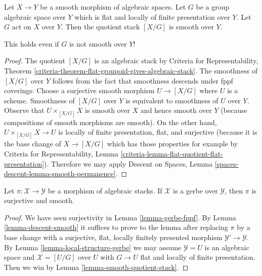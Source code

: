 \begin{lemma}
\label{lemma-smooth-quotient-stack}
Let $X \to Y$ be a smooth morphism of algebraic spaces.
Let $G$ be a group algebraic space over $Y$ which is flat
and locally of finite presentation over $Y$. Let $G$ act on $X$ over $Y$.
Then the quotient stack $[X/G]$ is smooth over $Y$.
\end{lemma}

\noindent
This holds even if $G$ is not smooth over $Y$!

\begin{proof}
The quotient $[X/G]$ is an algebraic stack by
Criteria for Representability, Theorem
\ref{criteria-theorem-flat-groupoid-gives-algebraic-stack}.
The smoothness of $[X/G]$ over $Y$ follows from the fact that smoothness
descends under fppf coverings:
Choose a surjective smooth morphism $U \to [X/G]$ where $U$ is a scheme.
Smoothness of $[X/G]$ over $Y$ is equivalent to smoothness of $U$ over $Y$.
Observe that $U \times_{[X/G]} X$ is smooth over $X$ and hence smooth
over $Y$ (because compositions of smooth morphisms are smooth).
On the other hand, $U \times_{[X/G]} X \to U$ is locally of
finite presentation, flat, and surjective (because it is
the base change of $X \to [X/G]$ which has those properties
for example by Criteria for Representability, Lemma
\ref{criteria-lemma-flat-quotient-flat-presentation}).
Therefore we may apply Descent on Spaces,
Lemma \ref{spaces-descent-lemma-smooth-permanence}.
\end{proof}

\begin{lemma}
\label{lemma-gerbe-smooth}
Let $\pi : \mathcal{X} \to \mathcal{Y}$ be a morphism of algebraic stacks.
If $\mathcal{X}$ is a gerbe over $\mathcal{Y}$, then $\pi$ is surjective
and smooth.
\end{lemma}

\begin{proof}
We have seen surjectivity in Lemma \ref{lemma-gerbe-fppf}.
By Lemma \ref{lemma-descent-smooth}
it suffices to prove to the lemma after replacing $\pi$ by a base change
with a surjective, flat, locally finitely presented morphism
$\mathcal{Y}' \to \mathcal{Y}$. By
Lemma \ref{lemma-local-structure-gerbe}
we may assume $\mathcal{Y} = U$ is an algebraic space and
$\mathcal{X} = [U/G]$ over $U$ with $G \to U$ flat and
locally of finite presentation.
Then we win by Lemma \ref{lemma-smooth-quotient-stack}.
\end{proof}






